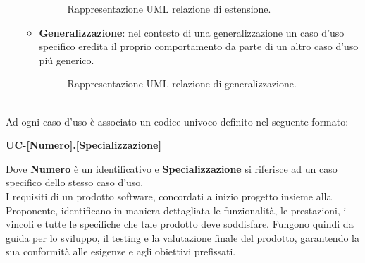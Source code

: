 \begin{itemize}
\begin{itemize}
\begin{figure}[H]
                \caption{Rappresentazione UML relazione di estensione.}
                \label{fig:Rappresentazione UML relazione di estensione}
            \end{figure}
        \item \textbf{Generalizzazione}: nel contesto di una generalizzazione un caso d'uso specifico eredita il proprio comportamento da parte di un altro caso d'uso piú generico. 
            \begin{figure}[H]
                \centering
                \caption{Rappresentazione UML relazione di generalizzazione.}
                \label{fig:Rappresentazione UML relazione di generalizzazione}
            \end{figure}
        \end{itemize}
\end{itemize}
\\
Ad ogni caso d'uso è associato un codice univoco definito nel seguente formato:
\begin{center}
    \textbf{UC-[Numero].[Specializzazione]}
\end{center}
Dove \textbf{Numero} è un identificativo e \textbf{Specializzazione} si riferisce ad un caso specifico
dello stesso caso d'uso.
\clearpage
{} \\
I requisiti di un prodotto software, concordati a inizio progetto insieme alla Proponente, identificano in maniera dettagliata le funzionalità, le prestazioni, i vincoli e tutte le specifiche che tale prodotto deve soddisfare. Fungono quindi da guida per lo sviluppo, il testing e la valutazione finale del prodotto, garantendo la sua conformità alle esigenze e agli obiettivi prefissati.\\
